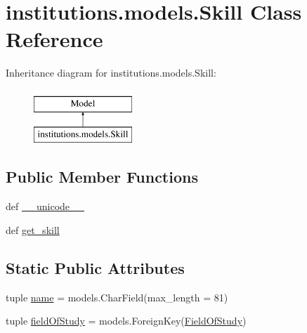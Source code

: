 \hypertarget{classinstitutions_1_1models_1_1_skill}{\section{institutions.\-models.\-Skill Class Reference}
\label{classinstitutions_1_1models_1_1_skill}
}
Inheritance diagram for institutions.\-models.\-Skill\-:\begin{figure}[H]
\begin{center}
\leavevmode
\includegraphics[height=2.000000cm]{classinstitutions_1_1models_1_1_skill}
\end{center}
\end{figure}
\subsection*{Public Member Functions}
\begin{DoxyCompactItemize}
\item 
def \hyperlink{classinstitutions_1_1models_1_1_skill_a56b5d439db2ff62bdad69f97aaf13d87}{\-\_\-\-\_\-unicode\-\_\-\-\_\-}
\item 
def \hyperlink{classinstitutions_1_1models_1_1_skill_a558a48ed3bfa5f94e5d18e9ee0cef0f4}{get\-\_\-skill}
\end{DoxyCompactItemize}
\subsection*{Static Public Attributes}
\begin{DoxyCompactItemize}
\item 
tuple \hyperlink{classinstitutions_1_1models_1_1_skill_a3bc150c6eed26bd098ddc31d631c084d}{name} = models.\-Char\-Field(max\-\_\-length = 81)
\item 
tuple \hyperlink{classinstitutions_1_1models_1_1_skill_af2b4c3564ab52b2a788f5bf1c03f5c10}{field\-Of\-Study} = models.\-Foreign\-Key(\hyperlink{classinstitutions_1_1models_1_1_field_of_study}{Field\-Of\-Study})
\end{DoxyCompactItemize}


